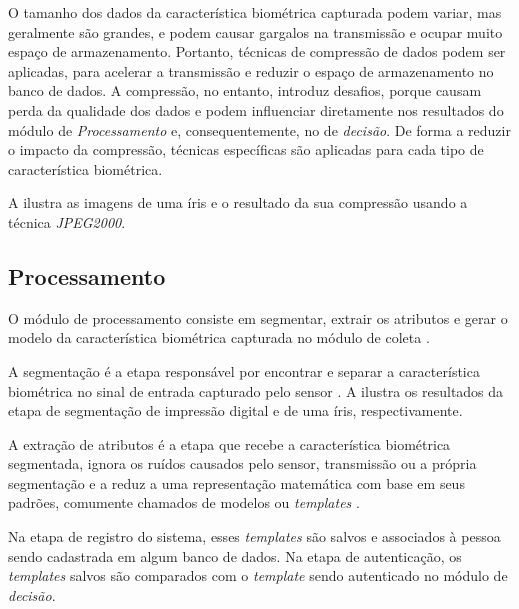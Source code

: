 \par O tamanho dos dados da característica biométrica capturada podem variar, mas geralmente são grandes, e podem causar gargalos na transmissão e ocupar muito espaço de armazenamento. Portanto, técnicas de compressão de dados podem ser aplicadas, para acelerar a transmissão e reduzir o espaço de armazenamento no banco de dados. A compressão, no entanto, introduz desafios, porque causam perda da qualidade dos dados e podem influenciar diretamente nos resultados do módulo de \textit{Processamento} e, consequentemente, no de \textit{decisão}. De forma a reduzir o impacto da compressão, técnicas específicas são aplicadas para cada tipo de característica biométrica.

\par A  ilustra as imagens de uma íris e o resultado da sua compressão usando a técnica \textit{JPEG2000}.


\subsection{Processamento}

\par O módulo de processamento consiste em segmentar, extrair os atributos e gerar o modelo da característica biométrica capturada no módulo de coleta \cite{wayman2005biometric}.

\par A segmentação é a etapa responsável por encontrar e separar a característica biométrica no sinal de entrada capturado pelo sensor \cite{wayman2005biometric}. A  ilustra os resultados da etapa de segmentação de impressão digital e de uma íris, respectivamente.


\par A extração de atributos é a etapa que recebe a característica biométrica segmentada, ignora os ruídos causados pelo sensor, transmissão ou a própria segmentação e a reduz a uma representação matemática com base em seus padrões, comumente chamados de modelos ou \textit{templates} \cite{wayman2005biometric}.

\par Na etapa de registro do sistema, esses \textit{templates} são salvos e associados à pessoa sendo cadastrada em algum banco de dados. Na etapa de autenticação, os \textit{templates} salvos são comparados com o \textit{template} sendo autenticado no módulo de \textit{decisão}.

